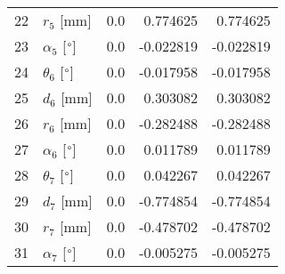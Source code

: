 \documentclass{standalone}%
\begin{document}
\begin{tabular}{llrrr}
22 &              $r_{5}$ [mm] &       0.0 &   0.774625 &   0.774625 \\
23 &  $\alpha_{5}$ [$\degree$] &       0.0 &  -0.022819 &  -0.022819 \\
24 &  $\theta_{6}$ [$\degree$] &       0.0 &  -0.017958 &  -0.017958 \\
25 &              $d_{6}$ [mm] &       0.0 &   0.303082 &   0.303082 \\
26 &              $r_{6}$ [mm] &       0.0 &  -0.282488 &  -0.282488 \\
27 &  $\alpha_{6}$ [$\degree$] &       0.0 &   0.011789 &   0.011789 \\
28 &  $\theta_{7}$ [$\degree$] &       0.0 &   0.042267 &   0.042267 \\
29 &              $d_{7}$ [mm] &       0.0 &  -0.774854 &  -0.774854 \\
30 &              $r_{7}$ [mm] &       0.0 &  -0.478702 &  -0.478702 \\
31 &  $\alpha_{7}$ [$\degree$] &       0.0 &  -0.005275 &  -0.005275 \\
\bottomrule
\end{tabular}
%
\end{document}
